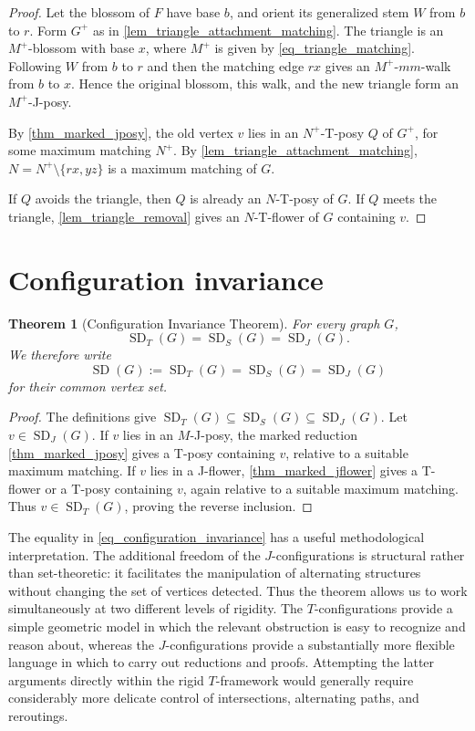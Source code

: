 \documentclass[preprint,12pt]{elsarticle}
\theoremstyle{plain}
\newtheorem{theorem}{Theorem}[section]
\newcommand{\SD}{\operatorname{SD}}
\begin{document}
\begin{proof}
Let the blossom of \(F\) have base \(b\), and orient its generalized stem
\(W\) from \(b\) to \(r\). Form \(G^+\) as in
\cref{lem_triangle_attachment_matching}. The triangle is an
\(M^+\)-blossom with base \(x\), where \(M^+\) is given by
\cref{eq_triangle_matching}. Following \(W\) from \(b\) to \(r\) and then
the matching edge \(rx\) gives an \(M^+\)-\(mm\)-walk from \(b\) to \(x\).
Hence the original blossom, this walk, and the new triangle form an
\(M^+\)-J-posy.

By \cref{thm_marked_jposy}, the old vertex \(v\) lies in an
\(N^+\)-T-posy \(Q\) of \(G^+\), for some maximum matching \(N^+\).
By \cref{lem_triangle_attachment_matching},
\(N=N^+\setminus\{rx,yz\}\) is a maximum matching of \(G\).

If \(Q\) avoids the triangle, then \(Q\) is already an \(N\)-T-posy of
\(G\). If \(Q\) meets the triangle, \cref{lem_triangle_removal} gives an
\(N\)-T-flower of \(G\) containing \(v\).
\end{proof}

\section{Configuration invariance}\label{sec_configuration_invariance}

\begin{theorem}[Configuration Invariance Theorem]
\label{thm_configuration_invariance}
For every graph \(G\),
\begin{equation}\label{eq_configuration_invariance}
\SD_T(G)=\SD_S(G)=\SD_J(G).
\end{equation}
We therefore write
\[
\SD(G):=\SD_T(G)=\SD_S(G)=\SD_J(G)
\]
for their common vertex set.
\end{theorem}

\begin{proof}
The definitions give
\(\SD_T(G)\subseteq\SD_S(G)\subseteq\SD_J(G)\).  Let
\(v\in\SD_J(G)\).  If \(v\) lies in an $M$-J-posy, the marked reduction
\cref{thm_marked_jposy} gives a T-posy containing \(v\), relative to a
suitable maximum matching.  If \(v\) lies in a J-flower,
\cref{thm_marked_jflower} gives a T-flower or a T-posy containing \(v\), again
relative to a suitable maximum matching.  Thus \(v\in\SD_T(G)\), proving the
reverse inclusion.
\end{proof}

The equality in \cref{eq_configuration_invariance} has a useful
methodological interpretation. The additional freedom of the
\(J\)-configurations is structural rather than set-theoretic: it facilitates
the manipulation of alternating structures without changing the set of
vertices detected. Thus the theorem allows us to work simultaneously at two
different levels of rigidity. The \(T\)-configurations provide a simple
geometric model in which the relevant obstruction is easy to recognize and
reason about, whereas the \(J\)-configurations provide a substantially more
flexible language in which to carry out reductions and proofs. Attempting the
latter arguments directly within the rigid \(T\)-framework would generally
require considerably more delicate control of intersections, alternating
paths, and reroutings.
\end{document}
